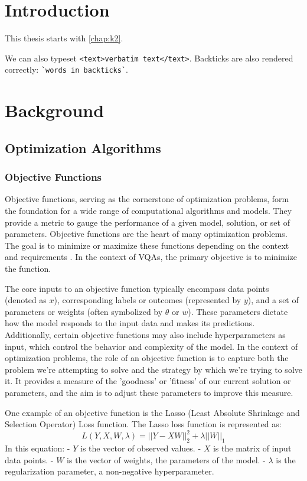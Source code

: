 \documentclass[
  a4paper,  %
  twoside,  %
  bibliography=totoc,
  headsepline,
  cleardoublepage=empty,
  parskip=half,
  draft=false
]{scrbook}
\begin{document}
\chapter{Introduction}

This thesis starts with \cref{chap:k2}.

We can also typeset \verb|<text>verbatim text</text>|.
Backticks are also rendered correctly: \verb|`words in backticks`|.

\chapter{Background}
\label{chap:literatureReview}
\section{Optimization Algorithms}
\label{sec:optimizationAlgorithms}
\subsection*{Objective Functions}
\label{subsec:objectiveFunctions}
Objective functions, serving as the cornerstone of optimization problems, form the foundation for a wide range of computational algorithms and models.
They provide a metric to gauge the performance of a given model, solution, or set of parameters.
Objective functions are the heart of many optimization problems.
The goal is to minimize or maximize these functions depending on the context and requirements \cite{Weinan2017}.
In the context of VQAs, the primary objective is to minimize the function.

The core inputs to an objective function typically encompass data points (denoted as $x$), corresponding labels or outcomes (represented by $y$), and a set of parameters or weights (often symbolized by $\theta$ or $w$).
These parameters dictate how the model responds to the input data and makes its predictions.
Additionally, certain objective functions may also include hyperparameters as input, which control the behavior and complexity of the model.
In the context of optimization problems, the role of an objective function is to capture both the problem we're attempting to solve and the strategy by which we're trying to solve it.
It provides a measure of the 'goodness' or 'fitness' of our current solution or parameters, and the aim is to adjust these parameters to improve this measure.

One example of an objective function is the Lasso (Least Absolute Shrinkage and Selection Operator) Loss function.
The Lasso loss function is represented as:
\[
L(Y, X, W, \lambda) = ||Y - XW||^2_2 + \lambda ||W||_1
\]
In this equation:
- \(Y\) is the vector of observed values.
- \(X\) is the matrix of input data points.
- \(W\) is the vector of weights, the parameters of the model.
- \(\lambda\) is the regularization parameter, a non-negative hyperparameter.
\end{document}
